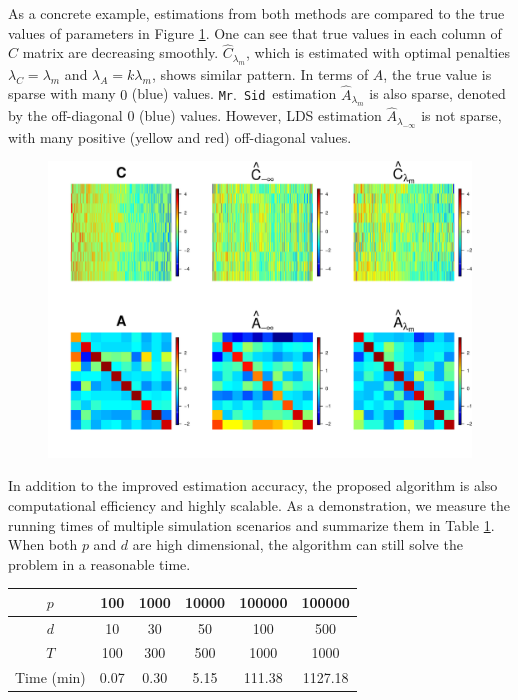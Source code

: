 \documentclass[fleqn,12pt]{article}
\let\oldref\ref
\renewcommand{\ref}[1]{(\oldref{#1})}
\newcommand{\mrsid}{{\sc \texttt{Mr}.~\texttt{Sid}}}
\begin{document}
As a concrete example, estimations from both methods are compared to the true values of parameters in Figure \oldref{fig:heatmap}. One can see that true values in each column of $C$ matrix are decreasing smoothly. $\hat{C}_{\lambda_m}$, which is estimated with optimal penalties $\lambda_C = \lambda_m$ and $\lambda_A = k\lambda_m$, shows similar pattern. In terms of $A$, the true value is sparse with many $0$ (blue) values. \mrsid~estimation $\hat{A}_{\lambda_m}$ is also sparse, denoted by the off-diagonal 0 (blue) values. However, LDS estimation $\hat{A}_{\lambda_{-\infty}}$ is not sparse, with many positive (yellow and red) off-diagonal values.
\begin{figure}
 \centering
 \includegraphics[scale=.6]{./figures/heatmap-figure-1}
 \label{fig:heatmap}
\end{figure}

In addition to the improved estimation accuracy, the proposed algorithm is also computational efficiency and highly scalable. As a demonstration, we measure the running times of multiple simulation scenarios and summarize them in Table \oldref{tab:runningTime}. When both $p$ and $d$ are high dimensional, the algorithm can still solve the problem in a reasonable time.
\begin{table}
\centering
\captionof{table}{\mrsid~Running Time}
\label{tab:runningTime}
\begin{tabular}{c|ccccc}
\hline\hline
$p$ & 100 & 1000 & 10000 & 100000 & 100000\\
\hline
$d$ & 10 & 30 & 50 & 100 & 500 \\
\hline
$T$ & 100 & 300 & 500 & 1000 & 1000 \\
\hline
Time (min)& 0.07 & 0.30  & 5.15 & 111.38 & 1127.18 \\
\hline\hline
\end{tabular}
\end{table}
\end{document}
